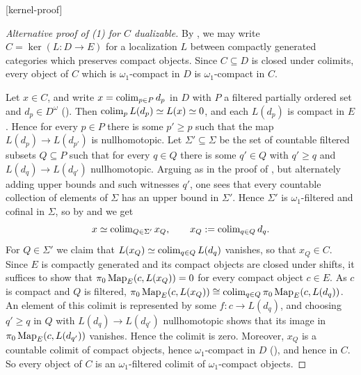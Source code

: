 	[kernel-proof]
	\begin{proof}[Alternative proof of (1) for $C$ dualizable]
		By , we may write $C = \ker(L\colon D \to E)$ for a localization $L$ between compactly generated categories which preserves compact objects. Since $C \subseteq D$ is closed under colimits, every object of $C$ which is $\omega_1$-compact in $D$ is $\omega_1$-compact in $C$.

		Let $x \in C$, and write $x = \operatorname{colim}_{p \in P} d_p$ in $D$ with $P$ a filtered partially ordered set and $d_p \in D^{\omega}$ (). Then $\operatorname{colim}_p L(d_p) \simeq L(x) \simeq 0$, and each $L(d_p)$ is compact in $E$. Hence for every $p \in P$ there is some $p' \geq p$ such that the map $L(d_p) \to L(d_{p'})$ is nullhomotopic. Let $\Sigma' \subseteq \Sigma$ be the set of countable filtered subsets $Q \subseteq P$ such that for every $q \in Q$ there is some $q' \in Q$ with $q' \geq q$ and $L(d_q) \to L(d_{q'})$ nullhomotopic. Arguing as in the proof of , but alternately adding upper bounds and such witnesses $q'$, one sees that every countable collection of elements of $\Sigma$ has an upper bound in $\Sigma'$. Hence $\Sigma'$ is $\omega_1$-filtered and cofinal in $\Sigma$, so by  and  we get
		\[
			x \simeq \operatorname{colim}_{Q \in \Sigma'} x_Q, \qquad x_Q := \operatorname{colim}_{q \in Q} d_q.
		\]
		For $Q \in \Sigma'$ we claim that $L(x_Q) \simeq \operatorname{colim}_{q \in Q} L(d_q)$ vanishes, so that $x_Q \in C$. Since $E$ is compactly generated and its compact objects are closed under shifts, it suffices to show that $\pi_0\operatorname{Map}_E(c,L(x_Q)) = 0$ for every compact object $c \in E$. As $c$ is compact and $Q$ is filtered, $\pi_0\operatorname{Map}_E(c,L(x_Q)) \cong \operatorname{colim}_{q \in Q} \pi_0\operatorname{Map}_E(c,L(d_q))$. An element of this colimit is represented by some $f\colon c \to L(d_q)$, and choosing $q' \geq q$ in $Q$ with $L(d_q) \to L(d_{q'})$ nullhomotopic shows that its image in $\pi_0\operatorname{Map}_E(c,L(d_{q'}))$ vanishes. Hence the colimit is zero. Moreover, $x_Q$ is a countable colimit of compact objects, hence $\omega_1$-compact in $D$ (), and hence in $C$. So every object of $C$ is an $\omega_1$-filtered colimit of $\omega_1$-compact objects.
	\end{proof}

